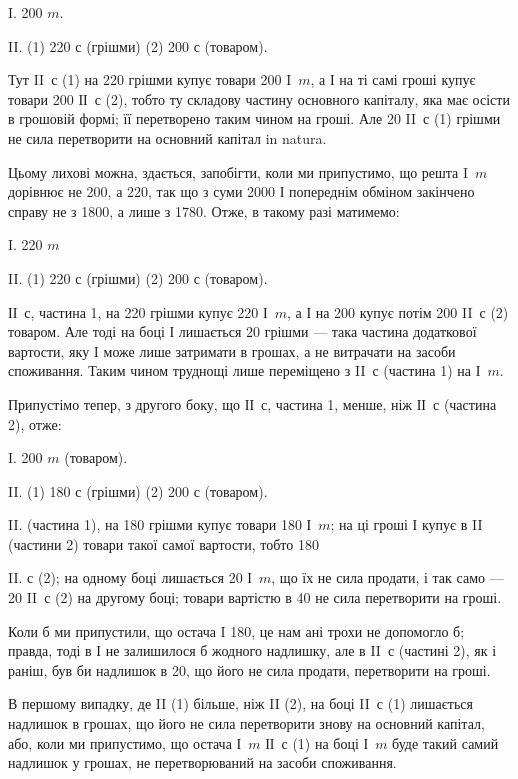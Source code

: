 
I.    200 $m$.

II. (1) 220 $с$ (грішми) \dplus{} (2) 200 $с$ (товаром).

Тут II~$с$ (1) на 220 грішми купує товари 200 I~$m$, а І на
ті самі гроші купує товари 200 ІІ~$с$ (2), тобто ту складову частину
основного капіталу, яка має осісти в грошовій формі; її перетворено
таким чином на гроші. Але 20 II~$с$ (1) грішми не сила перетворити на
основний капітал in natura.

Цьому лихові можна, здається, запобігти, коли ми припустимо, що решта
I~$m$ дорівнює не 200, а 220, так що з суми 2000 І попереднім обміном закінчено
справу не з 1800, а лише з 1780. Отже, в такому разі матимемо:

I.    220 $m$

II. (1) 220 $с$ (грішми) \dplus{} (2) 200 $с$ (товаром).

ІІ~$с$, частина 1, на 220 грішми купує 220 І~$m$, а І на
200 купує потім 200 II~$с$ (2) товаром. Але тоді на боці І
лишається 20 грішми — така частина додаткової вартости, яку
I може лише затримати в грошах, а не витрачати на засоби споживання.
Таким чином труднощі лише переміщено з II~$с$ (частина 1) на І~$m$.

Припустімо тепер, з другого боку, що ІІ~$с$, частина 1, менше, ніж ІІ~$с$
(частина 2), отже:


I.    200 $m$ (товаром).

II. (1) 180 $с$ (грішми) \dplus{} (2) 200 $с$ (товаром).

II. (частина 1), на 180 грішми купує товари 180 І~$m$; на ці
гроші І купує в II (частини 2) товари такої самої вартости, тобто 180

II.    $с$ (2); на одному боці лишається 20 І~$m$, що їх не сила продати, і так
само — 20 II~$с$ (2) на другому боці; товари вартістю в 40 не сила перетворити
на гроші.

Коли б ми припустили, що остача I \deq{} 180, це нам ані трохи не допомогло
б; правда, тоді в І не залишилося б жодного надлишку, але в II~$с$
(частині 2), як і раніш, був би надлишок в 20, що його не сила продати,
перетворити на гроші.

В першому випадку, де II (1) більше, ніж II (2), на боці II~$с$ (1)
лишається надлишок в грошах, що його не сила перетворити знову на
основний капітал, або, коли ми припустимо, що остача І~$m$ \deq{} ІІ~$с$ (1) на
боці І~$m$ буде такий самий надлишок у грошах, не перетворюваний на
засоби споживання.

